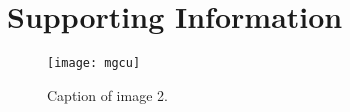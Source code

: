 \chapter{Supporting Information}\label{app:app2}

\begin{figure}[h]
	\centering
	\texttt{[image: mgcu]}
	\caption{Caption of image 2.}
	\label{fig: img2}
\end{figure}